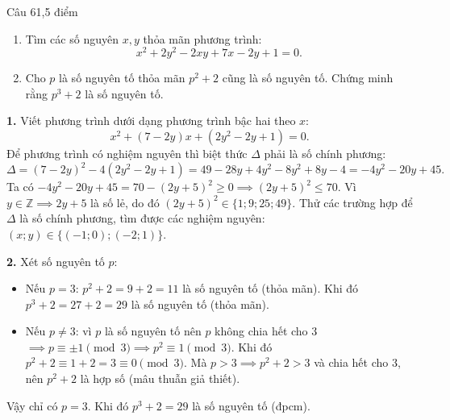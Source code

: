 \begin{de_cau}{Câu 6}{1,5 điểm}
\begin{enumerate}[label=\arabic*.]
\item Tìm các số nguyên $x, y$ thỏa mãn phương trình:
\[x^2 + 2y^2 - 2xy + 7x - 2y + 1 = 0.\]
\item Cho $p$ là số nguyên tố thỏa mãn $p^2 + 2$ cũng là số nguyên tố. Chứng minh rằng $p^3 + 2$ là số nguyên tố.
\end{enumerate}
\end{de_cau}

\begin{loi_giai_cau}
\textbf{1.} Viết phương trình dưới dạng phương trình bậc hai theo $x$:
\[x^2 + (7-2y)x + (2y^2-2y+1) = 0.\]
Để phương trình có nghiệm nguyên thì biệt thức $\Delta$ phải là số chính phương:
\[\Delta = (7-2y)^2 - 4(2y^2-2y+1) = 49 - 28y + 4y^2 - 8y^2 + 8y - 4 = -4y^2 - 20y + 45.\]
Ta có $-4y^2 - 20y + 45 = 70 - (2y+5)^2 \ge 0 \implies (2y+5)^2 \le 70$.
Vì $y \in \mathbb{Z} \implies 2y+5$ là số lẻ, do đó $(2y+5)^2 \in \{1; 9; 25; 49\}$.
Thử các trường hợp để $\Delta$ là số chính phương, tìm được các nghiệm nguyên: $\boxed{(x; y) \in \{(-1; 0); (-2; 1)\}}$.

\textbf{2.} Xét số nguyên tố $p$:
\begin{itemize}
\item Nếu $p = 3$: $p^2 + 2 = 9 + 2 = 11$ là số nguyên tố (thỏa mãn).
Khi đó $p^3 + 2 = 27 + 2 = 29$ là số nguyên tố (thỏa mãn).
\item Nếu $p \neq 3$: vì $p$ là số nguyên tố nên $p$ không chia hết cho 3 $\implies p \equiv \pm 1 \pmod 3 \implies p^2 \equiv 1 \pmod 3$.
Khi đó $p^2 + 2 \equiv 1 + 2 = 3 \equiv 0 \pmod 3$.
Mà $p > 3 \implies p^2 + 2 > 3$ và chia hết cho 3, nên $p^2 + 2$ là hợp số (mâu thuẫn giả thiết).
\end{itemize}
Vậy chỉ có $p = 3$. Khi đó $p^3 + 2 = 29$ là số nguyên tố (đpcm).
\end{loi_giai_cau}
